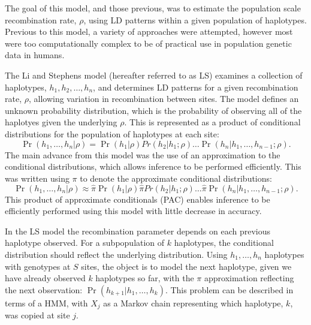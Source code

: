 The goal of this model, and those previous, was to estimate the population scale recombination rate, $\rho$, using LD patterns within a given population of haplotypes.
Previous to this model, a variety of approaches were attempted, however most were too computationally complex to be of practical use in population genetic data in humans\cite{Wall2000,Fearnhead2001}.


The Li and Stephens model (hereafter referred to as LS) examines a collection of haplotypes, $h_1,h_2,\dots,h_n$, and determines LD patterns for a given recombination rate, $\rho$, allowing variation in recombination between sites.
The model defines an unknown probability distribution, which is the probability of observing all of the haplotyes given the underlying $\rho$.
This is represented as a product of conditional distributions for the population of haplotypes at each site:
\begin{equation}
    \Pr(h_1,\dots, h_n | \rho ) = \Pr(h_1 |\rho) Pr(h_2 |h_1; \rho) \dots \Pr(h_n |h_1,\dots, h_{n-1}; \rho) .
\end{equation}
The main advance from this model was the use of an approximation to the conditional distributions, which allows inference to be performed efficiently.
This was written using $\pi$ to denote the approximate conditional distributions:
\begin{equation}
    \Pr(h_1,\dots, h_n | \rho ) \approx \hat{\pi} \Pr(h_1 |\rho) \hat{\pi} Pr(h_2 |h_1; \rho) \dots \hat{\pi} \Pr(h_n |h_1,\dots, h_{n-1}; \rho) .
\end{equation}
This product of approximate conditionals (PAC) enables inference to be efficiently performed using this model with little decrease in accuracy\cite{Li2003}.

In the LS model the recombination parameter depends on each previous haplotype observed.
For a subpopulation of $k$ haplotypes, the conditional distribution should reflect the underlying distribution.
Using $h_1,\dots,h_n$ haplotypes with genotypes at $S$ sites, the object is to model the next haplotype, given we have already observed $k$ haplotypes so far, with the $\pi$ approximation reflecting the next observation:
$ \Pr( h_{k+1} | h_1,\dots,h_k) $.
This problem can be described in terms of a HMM, with $X_j$ as a Markov chain representing which haplotype, $k$, was copied at site $j$.


